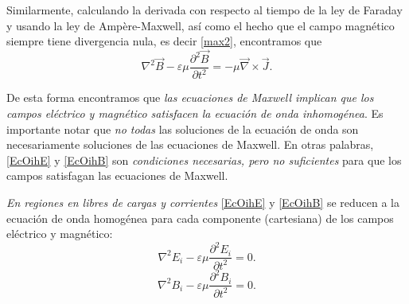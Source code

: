 Similarmente, calculando la derivada con respecto al tiempo de la ley de Faraday y usando la ley de Amp\`ere-Maxwell, así como el hecho que el campo magnético siempre tiene divergencia nula, es decir \eqref{max2}, encontramos que
\begin{equation}\label{EcOihB}
\boxed{\nabla^2\vec{B}-\varepsilon\mu\frac{\partial^2\vec{B}}{\partial t^2}=-\mu\vec\nabla\times\vec{J}.}
\end{equation}

De esta forma encontramos que \textit{las ecuaciones de Maxwell implican que los
campos eléctrico y magnético satisfacen la ecuación de onda inhomogénea}. Es importante notar que \textit{no todas} las soluciones de la ecuación de onda son necesariamente soluciones de las ecuaciones de Maxwell. En otras palabras, \eqref{EcOihE} y \eqref{EcOihB} son \textit{condiciones necesarias, pero no suficientes} para que los campos satisfagan las ecuaciones de Maxwell.

\textit{En regiones en libres de cargas y corrientes} \eqref{EcOihE} y \eqref{EcOihB} se reducen a la ecuación de onda homogénea para cada componente (cartesiana) de los campos eléctrico y magnético:
\begin{equation}\label{econdaE}
\boxed{\nabla^2E_i-\varepsilon\mu\frac{\partial^2E_i}{\partial t^2}=0.}
\end{equation}
\begin{equation}
\boxed{\nabla^2B_i-\varepsilon\mu\frac{\partial^2B_i}{\partial t^2}=0.}
\label{econdaB}
\end{equation}



